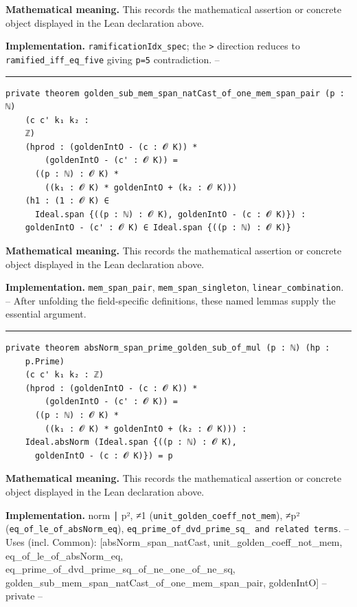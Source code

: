 \documentclass[UTF8,a4paper,11pt,fontset=fandol]{ctexart}
\theoremstyle{definition}
\newcommand{\statementsep}{\par\medskip\hrule\medskip}
\begin{document}
\noindent\textbf{Mathematical meaning.} This records the mathematical assertion or concrete object displayed in the Lean declaration above.\par
\noindent\textbf{Implementation.} \texttt{ramificationIdx\_\allowbreak{}spec}; the \texttt{>} direction reduces to \texttt{ramified\_\allowbreak{}iff\_\allowbreak{}eq\_\allowbreak{}five} giving \texttt{p=5} contradiction. --\par
\statementsep
\begin{verbatim}
private theorem golden_sub_mem_span_natCast_of_one_mem_span_pair (p : ℕ)
    (c c' k₁ k₂ :
    ℤ)
    (hprod : (goldenIntO - (c : 𝓞 K)) *
        (goldenIntO - (c' : 𝓞 K)) =
      ((p : ℕ) : 𝓞 K) *
        ((k₁ : 𝓞 K) * goldenIntO + (k₂ : 𝓞 K)))
    (h1 : (1 : 𝓞 K) ∈
      Ideal.span {((p : ℕ) : 𝓞 K), goldenIntO - (c : 𝓞 K)}) :
    goldenIntO - (c' : 𝓞 K) ∈ Ideal.span {((p : ℕ) : 𝓞 K)}
\end{verbatim}
\noindent\textbf{Mathematical meaning.} This records the mathematical assertion or concrete object displayed in the Lean declaration above.\par
\noindent\textbf{Implementation.} \texttt{mem\_\allowbreak{}span\_\allowbreak{}pair}, \texttt{mem\_\allowbreak{}span\_\allowbreak{}singleton}, \texttt{linear\_\allowbreak{}combination}. -- After unfolding the field-specific definitions, these named lemmas supply the essential argument.\par
\statementsep
\begin{verbatim}
private theorem absNorm_span_prime_golden_sub_of_mul (p : ℕ) (hp :
    p.Prime)
    (c c' k₁ k₂ : ℤ)
    (hprod : (goldenIntO - (c : 𝓞 K)) *
        (goldenIntO - (c' : 𝓞 K)) =
      ((p : ℕ) : 𝓞 K) *
        ((k₁ : 𝓞 K) * goldenIntO + (k₂ : 𝓞 K))) :
    Ideal.absNorm (Ideal.span {((p : ℕ) : 𝓞 K),
      goldenIntO - (c : 𝓞 K)}) = p
\end{verbatim}
\noindent\textbf{Mathematical meaning.} This records the mathematical assertion or concrete object displayed in the Lean declaration above.\par
\noindent\textbf{Implementation.} norm ∣ p², ≠1 (\texttt{unit\_\allowbreak{}golden\_\allowbreak{}coeff\_\allowbreak{}not\_\allowbreak{}mem}), ≠p² (\texttt{eq\_\allowbreak{}of\_\allowbreak{}le\_\allowbreak{}of\_\allowbreak{}absNorm\_\allowbreak{}eq}), \texttt{eq\_\allowbreak{}prime\_\allowbreak{}of\_\allowbreak{}dvd\_\allowbreak{}prime\_\allowbreak{}sq\_\allowbreak{} and related terms}. -- Uses (incl. Common): [absNorm\_\allowbreak{}span\_\allowbreak{}natCast, unit\_\allowbreak{}golden\_\allowbreak{}coeff\_\allowbreak{}not\_\allowbreak{}mem, eq\_\allowbreak{}of\_\allowbreak{}le\_\allowbreak{}of\_\allowbreak{}absNorm\_\allowbreak{}eq, eq\_\allowbreak{}prime\_\allowbreak{}of\_\allowbreak{}dvd\_\allowbreak{}prime\_\allowbreak{}sq\_\allowbreak{}of\_\allowbreak{}ne\_\allowbreak{}one\_\allowbreak{}of\_\allowbreak{}ne\_\allowbreak{}sq, golden\_\allowbreak{}sub\_\allowbreak{}mem\_\allowbreak{}span\_\allowbreak{}natCast\_\allowbreak{}of\_\allowbreak{}one\_\allowbreak{}mem\_\allowbreak{}span\_\allowbreak{}pair, goldenIntO] -- private --\par
\end{document}
